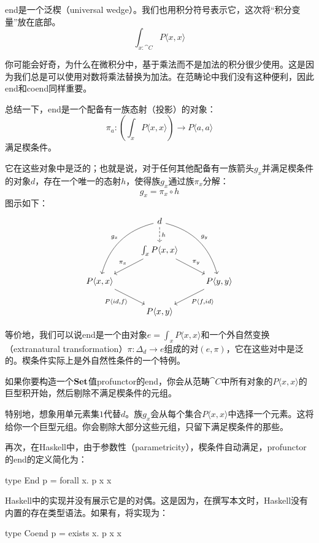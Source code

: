 \documentclass[DaoFP]{subfiles}
\begin{document}
end是一个泛楔（universal wedge）。我们也用积分符号表示它，这次将“积分变量”放在底部。
\[ \int_{x \colon \cat C} P \langle x, x \rangle \]

你可能会好奇，为什么在微积分中，基于乘法而不是加法的积分很少使用。这是因为我们总是可以使用对数将乘法替换为加法。在范畴论中我们没有这种便利，因此end和coend同样重要。

总结一下，end是一个配备有一族态射（投影）的对象：
\[ \pi_a \colon \left( \int_x P \langle x, x \rangle \right) \to P \langle a, a \rangle \]
满足楔条件。

它在这些对象中是泛的；也就是说，对于任何其他配备有一族箭头$g_x$并满足楔条件的对象$d$，存在一个唯一的态射$h$，使得族$g_x$通过族$\pi_x$分解：
\[ g_x = \pi_x \circ h \]
图示如下：
\[
 \begin{tikzcd}
 &d
 \arrow[ddl, bend right, "g_x"']
 \arrow[ddr, bend left, "g_y"]
 \arrow[d, dashed, "h"]
 \\
 & \int_x P \langle x, x \rangle
 \arrow[ld, "\pi_x"']
 \arrow[rd, "\pi_y"]
 \\
 P \langle x, x \rangle
 \arrow[dr, "{P \langle id, f \rangle}"']
 &&P \langle y, y \rangle
 \arrow[dl, "{P \langle f, id \rangle}"]
 \\
 & P \langle x, y \rangle
 \end{tikzcd}
\]

等价地，我们可以说end是一个由对象$e = \int_x P\langle x, x\rangle$和一个外自然变换（extranatural transformation）$\pi \colon \Delta_d \to e$组成的对$(e, \pi)$，它在这些对中是泛的。楔条件实际上是外自然性条件的一个特例。

如果你要构造一个$\mathbf{Set}$值profunctor的end，你会从范畴$\cat C$中所有对象的$P \langle x, x \rangle$的巨型积开始，然后剔除不满足楔条件的元组。

特别地，想象用单元素集$1$代替$d$。族$g_x$会从每个集合$P \langle x, x \rangle$中选择一个元素。这将给你一个巨型元组。你会剔除大部分这些元组，只留下满足楔条件的那些。

再次，在Haskell中，由于参数性（parametricity），楔条件自动满足，profunctor 的end的定义简化为：

\begin{haskell}
type End p = forall x. p x x
\end{haskell}

Haskell中的实现并没有展示它是的对偶。这是因为，在撰写本文时，Haskell没有内置的存在类型语法。如果有，将实现为：
\begin{haskell}
type Coend p = exists x. p x x
\end{haskell}
\end{document}
